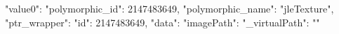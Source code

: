 {
    "value0": {
        "polymorphic_id": 2147483649,
        "polymorphic_name": "jleTexture",
        "ptr_wrapper": {
            "id": 2147483649,
            "data": {
                "imagePath": {
                    "_virtualPath": ""
                }
            }
        }
    }
}
